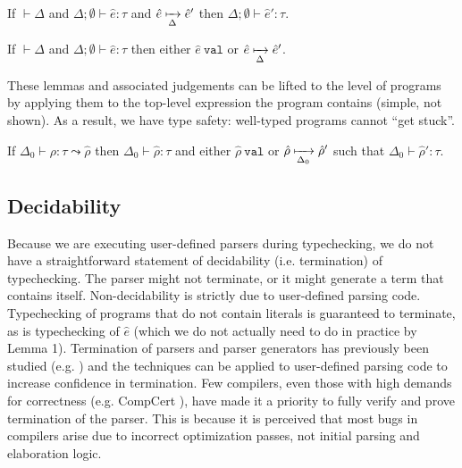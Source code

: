 \begin{lemma}[Preservation]
If $\vdash \Delta$ and $\Delta; \emptyset \vdash \hat{e} : \tau$ and  $\hat{e} \xmapsto[\Delta]{} \hat{e}'$ then $\Delta; \emptyset \vdash \hat{e}' : \tau$.
\end{lemma}
\begin{lemma}[Progress]
If  $\vdash \Delta$ and $\Delta; \emptyset \vdash \hat{e} : \tau$ then either $\hat{e}~\texttt{val}$ or $\hat{e} \xmapsto[\Delta]{} \hat{e}'$.
\end{lemma}
These lemmas and associated judgements can be lifted to the level of programs by applying them to the top-level expression the program contains (simple, not shown). As a result, we have type safety: well-typed programs cannot ``get stuck''.
\begin{theorem}
If $\Delta_0 \vdash \rho : \tau \leadsto \hat{\rho}$ then $\Delta_0 \vdash \hat{\rho} : \tau$ and either $\hat{\rho}~\texttt{val}$ or $\hat{\rho} \xmapsto[\Delta_0]{} \hat{\rho}'$ such that $\Delta_0 \vdash \hat{\rho}' : \tau$.
\end{theorem}
\subsection{Decidability}
Because we are executing user-defined parsers during typechecking, we do not have a straightforward statement of decidability (i.e. termination) of typechecking. The parser might not terminate, or it might generate a term that contains itself. Non-decidability is strictly due to user-defined parsing code. Typechecking of programs that do not contain literals is guaranteed to terminate, as is typechecking of $\hat{e}$ (which we do not actually need to do in practice by Lemma 1). Termination of parsers and parser generators has previously been studied (e.g. \cite{DBLP:conf/sle/KrishnanW12}) and the techniques can be applied to user-defined parsing code to increase confidence in termination. Few compilers, even those with high demands for correctness (e.g. CompCert \cite{compcert}), have made it a priority to fully verify and prove termination of the parser. This is because it is perceived that most bugs in compilers arise due to incorrect optimization passes, not initial parsing and elaboration logic.
